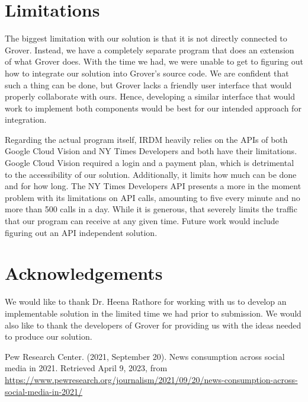 \documentclass[conference]{IEEEtran}
\begin{document}
\section{Limitations}

The biggest limitation with our solution is that it is not directly connected to Grover. Instead, we have a completely separate program that does an extension of what Grover does. With the time we had, we were unable to get to figuring out how to integrate our solution into Grover's source code. We are confident that such a thing can be done, but Grover lacks a friendly user interface that would properly collaborate with ours. Hence, developing a similar interface that would work to implement both components would be best for our intended approach for integration. 

Regarding the actual program itself, IRDM heavily relies on the APIs of both Google Cloud Vision and NY Times Developers and both have their limitations. Google Cloud Vision required a login and a payment plan, which is detrimental to the accessibility of our solution. Additionally, it limits how much can be done and for how long. The NY Times Developers API presents a more in the moment problem with its limitations on API calls, amounting to five every minute and no more than 500 calls in a day. While it is generous, that severely limits the traffic that our program can receive at any given time. Future work would include figuring out an API independent solution.

\section{Acknowledgements}

We would like to thank Dr. Heena Rathore for working with us to develop an implementable solution in the limited time we had prior to submission. We would also like to thank the developers of Grover for providing us with the ideas needed to produce our solution. 

\begin{thebibliography}{00}
 Pew Research Center. (2021, September 20). News consumption across social media in 2021. Retrieved April 9, 2023, from \url{https://www.pewresearch.org/journalism/2021/09/20/news-consumption-across-social-media-in-2021/}
\end{thebibliography}
\vspace{12pt}
\end{document}
